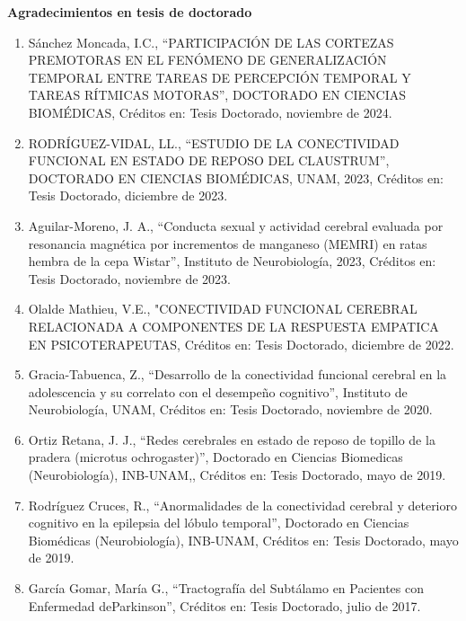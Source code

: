 \textbf{Agradecimientos en tesis de doctorado}

\hfill

\begin{enumerate}

\item Sánchez Moncada, I.C., “PARTICIPACIÓN DE LAS CORTEZAS PREMOTORAS EN EL FENÓMENO DE GENERALIZACIÓN TEMPORAL ENTRE 
TAREAS 
DE PERCEPCIÓN TEMPORAL Y TAREAS RÍTMICAS MOTORAS”, DOCTORADO EN CIENCIAS BIOMÉDICAS, Créditos en: Tesis Doctorado, 
noviembre de 2024.

\item RODRÍGUEZ-VIDAL, LL., “ESTUDIO DE LA CONECTIVIDAD FUNCIONAL EN ESTADO DE REPOSO DEL CLAUSTRUM”, DOCTORADO EN CIENCIAS 
BIOMÉDICAS, UNAM, 2023, Créditos en: Tesis Doctorado, diciembre de 2023.

\item Aguilar-Moreno, J. A., “Conducta sexual y actividad cerebral evaluada por resonancia magnética por incrementos de 
manganeso (MEMRI) en ratas hembra de la cepa Wistar”, Instituto de Neurobiología, 2023, Créditos en: Tesis Doctorado, 
noviembre de 2023.

\item Olalde Mathieu, V.E., "CONECTIVIDAD FUNCIONAL CEREBRAL RELACIONADA A COMPONENTES DE LA RESPUESTA EMPATICA EN 
PSICOTERAPEUTAS, Créditos en: Tesis Doctorado, diciembre de 2022.

\item Gracia-Tabuenca, Z., “Desarrollo de la conectividad funcional cerebral en la adolescencia y su correlato 
con el desempeño cognitivo”, Instituto de Neurobiología, UNAM, Créditos en: Tesis Doctorado, noviembre de 2020.

\item Ortiz Retana, J. J., “Redes cerebrales en estado de reposo de topillo de la pradera (microtus ochrogaster)”, 
Doctorado 
en Ciencias Biomedicas (Neurobiología), INB-UNAM,, Créditos en: Tesis Doctorado, mayo de 2019.

\item Rodríguez Cruces, R., “Anormalidades de la conectividad cerebral y deterioro cognitivo en la epilepsia del lóbulo 
temporal”, Doctorado en Ciencias Biomédicas (Neurobiología), INB-UNAM, Créditos en: Tesis Doctorado, mayo de 2019.

\item García Gomar, María G., “Tractografía del Subtálamo en Pacientes con Enfermedad deParkinson”, Créditos en: Tesis 
Doctorado, julio de 2017.


\end{enumerate}
